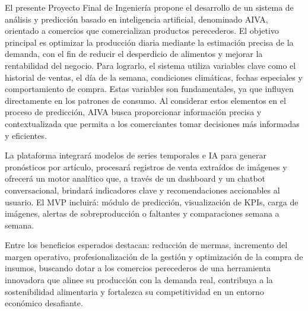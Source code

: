 \begin{Resumen} %

    El presente Proyecto Final de Ingeniería propone el desarrollo de un sistema de análisis y predicción basado en inteligencia artificial, denominado AIVA, orientado a comercios que comercializan productos perecederos. El objetivo principal es optimizar la producción diaria mediante la estimación precisa de la demanda, con el fin de reducir el desperdicio de alimentos y mejorar la rentabilidad del negocio. Para lograrlo, el sistema utiliza variables clave como el historial de ventas, el día de la semana, condiciones climáticas, fechas especiales y comportamiento de compra. Estas variables son fundamentales, ya que influyen directamente en los patrones de consumo. Al considerar estos elementos en el proceso de predicción, AIVA busca proporcionar información precisa y contextualizada que permita a los comerciantes tomar decisiones más informadas y eficientes.
    
    La plataforma integrará modelos de series temporales e IA para generar pronósticos por artículo, procesará registros de venta extraídos de imágenes y ofrecerá un motor analítico que, a través de un dashboard y un chatbot conversacional, brindará indicadores clave y recomendaciones accionables al usuario. El MVP incluirá: módulo de predicción, visualización de KPIs, carga de imágenes, alertas de sobreproducción o faltantes y comparaciones semana a semana.

    Entre los beneficios esperados destacan: reducción de mermas, incremento del margen operativo, profesionalización de la gestión y optimización de la compra de insumos, buscando dotar a los comercios perecederos de una herramienta innovadora que alinee su producción con la demanda real, contribuya a la sostenibilidad alimentaria y fortalezca su competitividad en un entorno económico desafiante. 

\end{Resumen}
